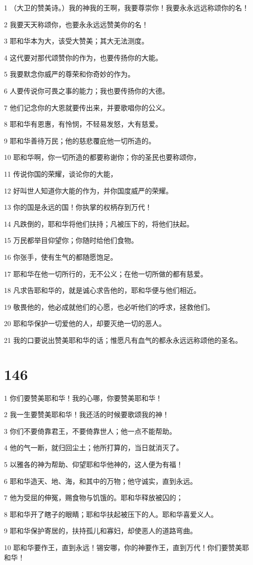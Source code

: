 \par 1 （大卫的赞美诗。）我的神我的王啊，我要尊崇你！我要永永远远称颂你的名！
\par 2 我要天天称颂你，也要永永远远赞美你的名！
\par 3 耶和华本为大，该受大赞美；其大无法测度。
\par 4 这代要对那代颂赞你的作为，也要传扬你的大能。
\par 5 我要默念你威严的尊荣和你奇妙的作为。
\par 6 人要传说你可畏之事的能力；我也要传扬你的大德。
\par 7 他们记念你的大恩就要传出来，并要歌唱你的公义。
\par 8 耶和华有恩惠，有怜悯，不轻易发怒，大有慈爱。
\par 9 耶和华善待万民；他的慈悲覆庇他一切所造的。
\par 10 耶和华啊，你一切所造的都要称谢你；你的圣民也要称颂你，
\par 11 传说你国的荣耀，谈论你的大能，
\par 12 好叫世人知道你大能的作为，并你国度威严的荣耀。
\par 13 你的国是永远的国！你执掌的权柄存到万代！
\par 14 凡跌倒的，耶和华将他们扶持；凡被压下的，将他们扶起。
\par 15 万民都举目仰望你；你随时给他们食物。
\par 16 你张手，使有生气的都随愿饱足。
\par 17 耶和华在他一切所行的，无不公义；在他一切所做的都有慈爱。
\par 18 凡求告耶和华的，就是诚心求告他的，耶和华便与他们相近。
\par 19 敬畏他的，他必成就他们的心愿，也必听他们的呼求，拯救他们。
\par 20 耶和华保护一切爱他的人，却要灭绝一切的恶人。
\par 21 我的口要说出赞美耶和华的话；惟愿凡有血气的都永永远远称颂他的圣名。

\chapter{146}

\par 1 你们要赞美耶和华！我的心哪，你要赞美耶和华！
\par 2 我一生要赞美耶和华！我还活的时候要歌颂我的神！
\par 3 你们不要倚靠君王，不要倚靠世人；他一点不能帮助。
\par 4 他的气一断，就归回尘土；他所打算的，当日就消灭了。
\par 5 以雅各的神为帮助、仰望耶和华他神的，这人便为有福！
\par 6 耶和华造天、地、海，和其中的万物；他守诚实，直到永远。
\par 7 他为受屈的伸冤，赐食物与饥饿的。耶和华释放被囚的；
\par 8 耶和华开了瞎子的眼睛；耶和华扶起被压下的人。耶和华喜爱义人。
\par 9 耶和华保护寄居的，扶持孤儿和寡妇，却使恶人的道路弯曲。
\par 10 耶和华要作王，直到永远！锡安哪，你的神要作王，直到万代！你们要赞美耶和华！

